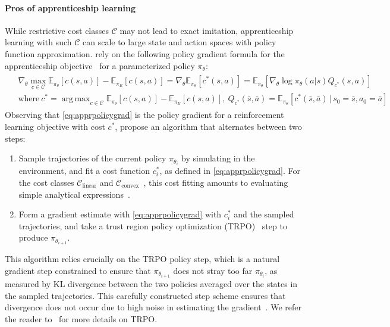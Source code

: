 \documentclass{article}
\newcommand\bbE{\ensuremath{\mathbb{E}}} %
\DeclareMathOperator*{\argmax}{arg\,max}
\newcommand{\1}{\mathbb{I}} %
\begin{document}
\paragraph{Pros of apprenticeship learning} While restrictive cost classes $\mathcal{C}$ may not lead to exact imitation, apprenticeship learning with such $\mathcal{C}$ can scale to large state and action spaces with policy function approximation.
\citet{ho2016model} rely on the following policy gradient formula for the apprenticeship  objective~ for a parameterized policy $\pi_\theta$:
\begin{align} \begin{split}
&\nabla_\theta \max_{c \in \mathcal{C}} \bbE_{\pi_\theta}[c(s,a)] - \bbE_{\pi_E}[c(s,a)] = \nabla_\theta \bbE_{\pi_\theta}[c^*(s,a)] = \bbE_{\pi_\theta} \left[\nabla_\theta \log\pi_\theta(a|s) Q_{c^*}(s,a) \right] \label{eq:apprpolicygrad} \\
&\text{where} \ c^* \!= \argmax_{c\in\mathcal{C}} \bbE_{\pi_\theta}[c(s,a)] - \bbE_{\pi_E}[c(s,a)],
 \ Q_{c^*}(\bar s,\bar a) = \bbE_{\pi_\theta}[c^*(\bar s, \bar a) \,|\, s_0=\bar s,a_0=\bar a]
\end{split} \end{align}
Observing that \cref{eq:apprpolicygrad} is the policy gradient for a reinforcement learning objective with cost $c^*$, \citeauthor{ho2016model} propose an algorithm that alternates between two steps:
\begin{enumerate}
\item Sample trajectories of the current policy $\pi_{\theta_i}$ by simulating in the environment, and fit a cost function $c^*_i$, as defined in \cref{eq:apprpolicygrad}.
For the cost classes $\mathcal{C}_\text{linear}$ and $\mathcal{C}_\text{convex}$~, this cost fitting amounts to evaluating simple analytical expressions~\citep{ho2016model}.
\item Form a gradient estimate with \cref{eq:apprpolicygrad} with $c^*_i$ and the sampled trajectories, and take a trust region policy optimization (TRPO)~\citep{schulman2015trust} step to produce $\pi_{\theta_{i+1}}$.
\end{enumerate}

This algorithm relies crucially on the TRPO policy step, which is a natural gradient step constrained to ensure that $\pi_{\theta_{i+1}}$ does not stray too far $\pi_{\theta_i}$, as measured by KL divergence between the two policies averaged over the states in the sampled trajectories.
This carefully constructed step scheme ensures that divergence does not occur due to high noise in estimating the gradient~.
We refer the reader to~\citet{schulman2015trust} for more details on TRPO.
\end{document}

